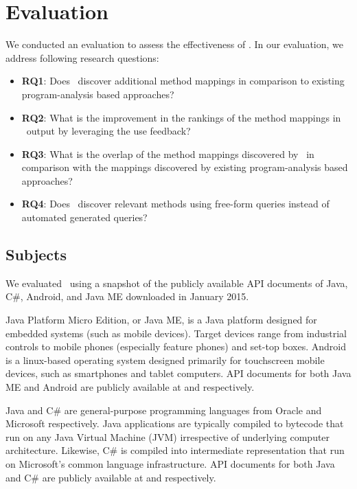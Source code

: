 \section{Evaluation}
\label{sec:evaluation}

We conducted an evaluation to assess the effectiveness of \tool. In our evaluation, we address following research questions:

\begin{itemize}
	
\item\textbf{RQ1}: Does \tool\ discover additional method mappings in comparison to existing program-analysis based approaches?

\item\textbf{RQ2}: What is the improvement in the rankings of the method mappings in \tool\ output by leveraging the use feedback?

\item\textbf{RQ3}: What is the overlap of the method mappings discovered by \tool\ in comparison with the mappings discovered by existing program-analysis based approaches?


\item\textbf{RQ4}: Does \tool\ discover relevant methods using free-form queries instead of automated generated queries?

\end{itemize}

\subsection{Subjects}
\label{sub:subject}


We evaluated \tool\ using a snapshot of the publicly available API documents of Java, C\#, Android, and Java ME downloaded in January 2015. 

Java Platform Micro Edition, or Java ME, is a Java platform designed for embedded systems (such as mobile devices). Target devices range from industrial controls to mobile phones (especially feature phones) and set-top boxes.
Android is a linux-based operating system designed primarily for touchscreen mobile devices, such as smartphones and tablet computers.
API documents for both Java ME and Android are publicly available at \cite{j2meAPI} and \cite{androidAPI} respectively.

Java and C\# are general-purpose programming languages from Oracle and Microsoft respectively. Java applications are typically compiled to bytecode that run on any Java Virtual Machine (JVM) irrespective of underlying computer architecture.
Likewise, C\# is compiled into intermediate representation that run on Microsoft's common language infrastructure.
API documents for both Java and C\# are publicly available at \cite{javaAPI} and \cite{dotNETAPI} respectively.



